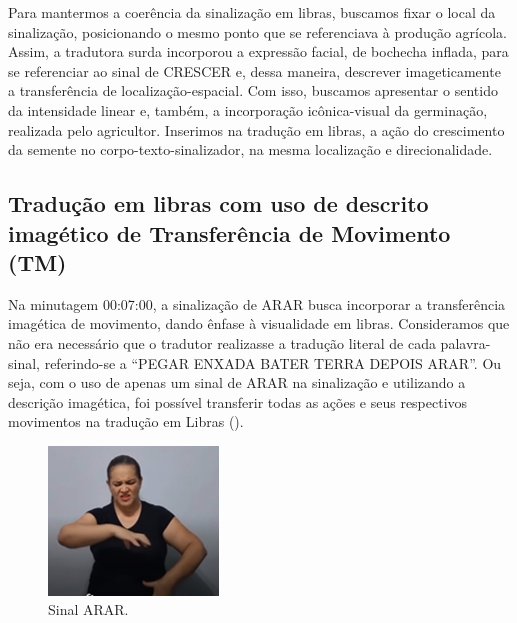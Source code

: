 \documentclass[portuguese]{textolivre}
\begin{document}
Para mantermos a coerência da sinalização em libras, buscamos fixar o local da sinalização, posicionando o mesmo ponto que se referenciava à produção agrícola. Assim, a tradutora surda incorporou a expressão facial, de bochecha inflada, para se referenciar ao sinal de CRESCER e, dessa maneira, descrever imageticamente a transferência de localização-espacial. Com isso, buscamos apresentar o sentido da intensidade linear e, também, a incorporação icônica-visual da germinação, realizada pelo agricultor. Inserimos na tradução em libras, a ação do crescimento da semente no corpo-texto-sinalizador, na mesma localização e direcionalidade.

\subsection{Tradução em libras com uso de descrito imagético de Transferência de Movimento (TM)}\label{sec-titulo}
Na minutagem 00:07:00, a sinalização de ARAR busca incorporar a transferência imagética de movimento, dando ênfase à visualidade em libras. Consideramos que não era necessário que o tradutor realizasse a tradução literal de cada palavra-sinal, referindo-se a “PEGAR ENXADA BATER TERRA DEPOIS ARAR”. Ou seja, com o uso de apenas um sinal de ARAR na sinalização e utilizando a descrição imagética, foi possível transferir todas as ações e seus respectivos movimentos na tradução em Libras ().

\begin{figure}[h!]
    \centering
    \begin{minipage}{0.3\linewidth}
    \includegraphics[width=\linewidth]{Fig10.png}
    \caption{Sinal ARAR.}
    \label{fig10}
    \end{minipage}
\end{figure}
\end{document}
